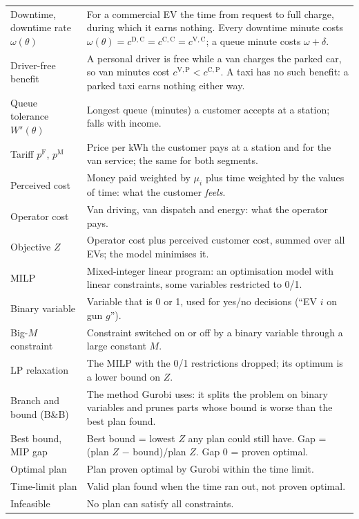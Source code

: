 \begin{xltabular}{\textwidth}{@{}>{\raggedright\arraybackslash}p{4.0cm}X@{}}
Downtime, downtime rate $\omega(\theta)$ & For a commercial EV the time from request to full charge, during which it earns nothing. Every downtime minute costs $\omega(\theta)=c^{\mathrm D,\mathrm C}=c^{\mathrm C,\mathrm C}=c^{\mathrm V,\mathrm C}$; a queue minute costs $\omega+\delta$. \\
Driver-free benefit & A personal driver is free while a van charges the parked car, so van minutes cost $c^{\mathrm V,\mathrm P}<c^{\mathrm C,\mathrm P}$. A taxi has no such benefit: a parked taxi earns nothing either way. \\
Queue tolerance $W^{s}(\theta)$ & Longest queue (minutes) a customer accepts at a station; falls with income. \\
Tariff $p^{\mathrm F}$, $p^{\mathrm M}$ & Price per kWh the customer pays at a station and for the van service; the same for both segments. \\
Perceived cost & Money paid weighted by $\mu_i$ plus time weighted by the values of time: what the customer \emph{feels}. \\
Operator cost & Van driving, van dispatch and energy: what the operator pays. \\
Objective $Z$ & Operator cost plus perceived customer cost, summed over all EVs; the model minimises it. \\
MILP & Mixed-integer linear program: an optimisation model with linear constraints, some variables restricted to 0/1. \\
Binary variable & Variable that is 0 or 1, used for yes/no decisions (``EV $i$ on gun $g$''). \\
Big-$M$ constraint & Constraint switched on or off by a binary variable through a large constant $M$. \\
LP relaxation & The MILP with the 0/1 restrictions dropped; its optimum is a lower bound on $Z$. \\
Branch and bound (B\&B) & The method Gurobi uses: it splits the problem on binary variables and prunes parts whose bound is worse than the best plan found. \\
Best bound, MIP gap & Best bound = lowest $Z$ any plan could still have. Gap = (plan $Z$ $-$ bound)/plan $Z$. Gap 0 = proven optimal. \\
Optimal plan & Plan proven optimal by Gurobi within the time limit. \\
Time-limit plan & Valid plan found when the time ran out, not proven optimal. \\
Infeasible & No plan can satisfy all constraints. \\

\end{xltabular}
